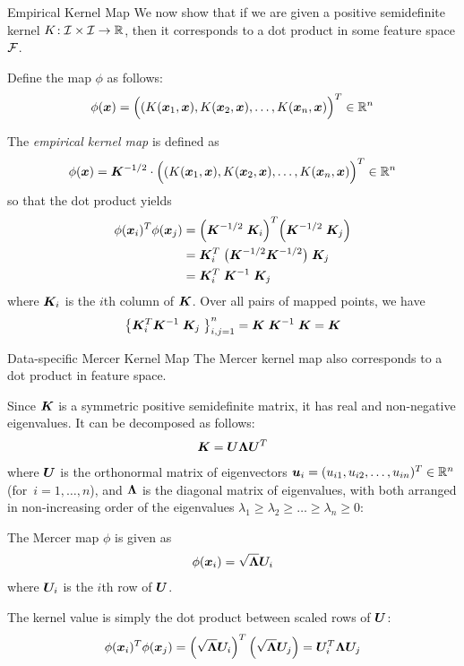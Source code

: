 \begin{frame}{Empirical Kernel Map}
We now show that if we are given a positive semidef\/{i}nite kernel
$K\!: {\mathcal I} \times {\mathcal I} \to {\mathord{\mathbb R}}$, then it corresponds to a dot product in
some feature space ${\mathcal F}$.

\bigskip
Def\/{i}ne the
map $\phi$ as follows:
\begin{align*}
  \phi({\boldsymbol x}) =
  \Big((K({\boldsymbol x}_1, {\boldsymbol x}), K({\boldsymbol x}_2, {\boldsymbol x}), \ldots,  K({\boldsymbol x}_n, {\boldsymbol x})
  \Big)^T \in {\mathord{\mathbb R}}^n
\end{align*}

The {\em empirical kernel map} is
def\/{i}ned as
\begin{align*}
  \phi({\boldsymbol x}) = {\boldsymbol K}^{-1/2} \cdot  \Big((K({\boldsymbol x}_1, {\boldsymbol x}), K({\boldsymbol x}_2, {\boldsymbol x}), \ldots,  K({\boldsymbol x}_n, {\boldsymbol x}) \Big)^T \in {\mathord{\mathbb R}}^n
\end{align*}
so that the dot product yields
\begin{align*}
  \phi({\boldsymbol x}_i)^T\phi({\boldsymbol x}_{j}) & =
  \Bigl({\boldsymbol K}^{-1/2} \; {\boldsymbol K}_i\Bigr)^T
  \Bigl({\boldsymbol K}^{-1/2} \; {\boldsymbol K}_{j}\Bigr) \\
  & = {\boldsymbol K}_i^T\; \bigl( {\boldsymbol K}^{-1/2}{\boldsymbol K}^{-1/2} \bigr) \; {\boldsymbol K}_{j}\\
  & = {\boldsymbol K}_i^T\; {\boldsymbol K}^{-1}\; {\boldsymbol K}_{j}
\end{align*}
where ${\boldsymbol K}_i$ is the $i$th column of ${\boldsymbol K}$.
Over all pairs of mapped points, we have
\begin{align*}
  \left\{ {\boldsymbol K}_i^T {\boldsymbol K}^{-1}\; {\boldsymbol K}_{j}\; \right\}_{i,j=1}^n = {\boldsymbol K}\; {\boldsymbol K}^{-1}\; {\boldsymbol K} = {\boldsymbol K}
\end{align*}
\end{frame}


\begin{frame}{Data-specif\/{i}c Mercer Kernel Map}
\small
The Mercer kernel map also corresponds to a dot product in feature
space.

\medskip
Since ${\boldsymbol K}$ is a symmetric
positive semidef\/{i}nite matrix, it has real and 
non-negative eigenvalues.
It can be decomposed as follows:
\begin{align*}
  {\boldsymbol K} = {\boldsymbol U} {\bm \Lambda} {\boldsymbol U}^T
\end{align*}
where ${\boldsymbol U}$ is the orthonormal matrix of eigenvectors
${\boldsymbol u}_i = (u_{i1}, u_{i2}, \ldots, u_{in})^T \in {\mathord{\mathbb R}}^n$ (for~$i=1,\ldots,n$), and ${\bm \Lambda}$ is
the diagonal matrix of eigenvalues, with both arranged in non-increasing
order of the eigenvalues
$\lambda_1 \ge \lambda_2 \ge \ldots \ge \lambda_n \ge 0$:

The Mercer map $\phi$ is given as
\begin{align*}
  \phi({\boldsymbol x}_i) = \sqrt{{\bm \Lambda}} {\boldsymbol U}_i
\end{align*}
where ${\boldsymbol U}_i$ is the $i$th row of ${\boldsymbol U}$.

The kernel value is simply the dot product between
scaled rows of ${\boldsymbol U}$:
\begin{align*}
   \phi({\boldsymbol x}_i)^T\phi({\boldsymbol x}_{j}) = \left(\sqrt{{\bm \Lambda}} {\boldsymbol U}_i\right)^T
   \left(\sqrt{{\bm \Lambda}} {\boldsymbol U}_{j}\right) = {\boldsymbol U}_i^T {\bm \Lambda} {\boldsymbol U}_{j}
\end{align*}
\end{frame}


